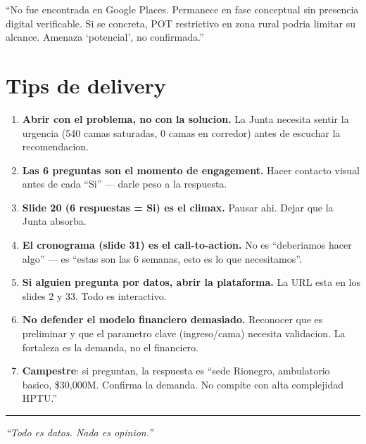 \documentclass[11pt, a4paper]{article}
\begin{document}
\begin{tip}
``No fue encontrada en Google Places. Permanece en fase conceptual sin presencia digital verificable. Si se concreta, POT restrictivo en zona rural podria limitar su alcance. Amenaza `potencial', no confirmada.''
\end{tip}

\section{Tips de delivery}

\begin{enumerate}[leftmargin=*, itemsep=6pt]
  \item \textbf{Abrir con el problema, no con la solucion.} La Junta necesita sentir la urgencia (540 camas saturadas, 0 camas en corredor) antes de escuchar la recomendacion.

  \item \textbf{Las 6 preguntas son el momento de engagement.} Hacer contacto visual antes de cada ``Si'' --- darle peso a la respuesta.

  \item \textbf{Slide 20 (6 respuestas = Si) es el climax.} Pausar ahi. Dejar que la Junta absorba.

  \item \textbf{El cronograma (slide 31) es el call-to-action.} No es ``deberiamos hacer algo'' --- es ``estas son las 6 semanas, esto es lo que necesitamos''.

  \item \textbf{Si alguien pregunta por datos, abrir la plataforma.} La URL esta en los slides 2 y 33. Todo es interactivo.

  \item \textbf{No defender el modelo financiero demasiado.} Reconocer que es preliminar y que el parametro clave (ingreso/cama) necesita validacion. La fortaleza es la demanda, no el financiero.

  \item \textbf{Campestre}: si preguntan, la respuesta es ``sede Rionegro, ambulatorio basico, \$30,000M. Confirma la demanda. No compite con alta complejidad HPTU.''
\end{enumerate}

\vfill
\begin{center}
{\color{hptu}\rule{0.6\textwidth}{1pt}}

\vspace{6pt}
{\small\color{slate}\textit{``Todo es datos. Nada es opinion.''}}
\end{center}
\end{document}
